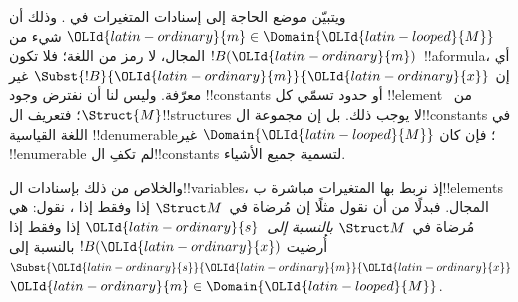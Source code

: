 \documentclass[../../../include/open-logic-section]{subfiles}
\begin{document}
\begin{explain}
ويتبيّن موضع الحاجة إلى إسنادات المتغيرات في
. وذلك أن ${\OLId{latin-ordinary}{m}} \in \Domain {\OLId{latin-looped}{M}}$
شيء من المجال، لا رمز من اللغة؛ فلا تكون $!B({\OLId{latin-ordinary}{m}})$~!!a{formula}،
أي إن $\Subst{!B}{{\OLId{latin-ordinary}{m}}}{{\OLId{latin-ordinary}{x}}}$ غير معرّفة. وليس لنا أن نفترض وجود
!!{constant}s أو حدود تسمّي كل !!{element} من~$\Struct{M}$؛
فتعريف ال!!{structure}s لا يوجب ذلك. بل إن مجموعة
ال!!{constant}s في اللغة القياسية !!{denumerable}؛ فإن كان
$\Domain{{\OLId{latin-looped}{M}}}$ غير !!{enumerable} لم تكفِ ال!!{constant}s
لتسمية جميع الأشياء.

والخلاص من ذلك بإسنادات ال!!{variable}s، إذ نربط بها المتغيرات
مباشرة ب!!{element}s المجال. فبدلًا من أن نقول مثلًا إن
 مُرضاة
في~$\Struct M$ إذا وفقط إذا
،
نقول: هي مُرضاة في~$\Struct M$ \emph{بالنسبة إلى}~${\OLId{latin-ordinary}{s}}$ إذا وفقط
إذا أُرضيت $!B({\OLId{latin-ordinary}{x}})$ بالنسبة إلى~$\Subst{{\OLId{latin-ordinary}{s}}}{{\OLId{latin-ordinary}{m}}}{{\OLId{latin-ordinary}{x}}}$
 ${\OLId{latin-ordinary}{m}} \in \Domain {\OLId{latin-looped}{M}}$.
\end{explain}
\end{document}
